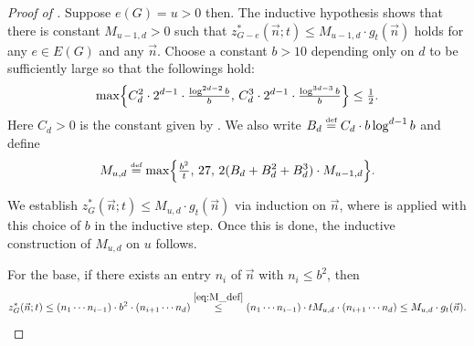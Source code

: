 \documentclass[11pt]{article}
\theoremstyle{definition}
\newcommand*{\eqdef}{\stackrel{\mbox{\normalfont\tiny def}}{=}} %
\newcommand*{\vn}{\vec{n}}
\begin{document}
\begin{proof}[Proof of ]
    Suppose $e(G) = u > 0$ then. The inductive hypothesis shows that there is constant $M_{u-1, d} > 0$ such that $z^*_{G-e}(\vn; t) \le M_{u-1, d} \cdot g_t(\vn)$ holds for any $e \in E(G)$ and any $\vn$. Choose a constant $b > 10$ depending only on $d$ to be sufficiently large so that the followings hold: 
    \begin{equation} \label{eq:b_def}
        \max \Bigl\{ C_d^2 \cdot 2^{d-1} \cdot \tfrac{\log^{2d-2}b}{b}, \, C_d^3 \cdot 2^{d-1} \cdot \tfrac{\log^{3d-3}b}{b} \Bigr\} \le \tfrac{1}{2}. 
    \end{equation}
    Here $C_d > 0$ is the constant given by . We also write $B_d \eqdef C_d \cdot b\log^{d-1} b$ and define
    \begin{equation} \label{eq:M_def}
        M_{u, d} \eqdef \max \Bigl\{ \tfrac{b^2}{t}, \, 27, \, 2(B_d+B_d^2+B_d^3) \cdot M_{u-1,d} \Bigr\}. 
    \end{equation}
    
    We establish $z^*_G(\vn; t) \le M_{u, d} \cdot g_t(\vn)$ via induction on $\vn$, where  is applied with this choice of $b$ in the inductive step. Once this is done, the inductive construction of $M_{u, d}$ on $u$ follows. 
    
    For the base, if there exists an entry $n_i$ of $\vn$ with $n_i \le b^2$, then
    \[
    z^*_G(\vn; t) \le (n_1 \cdots n_{i-1}) \cdot b^2 \cdot (n_{i+1} \cdots n_d) \overset{\eqref{eq:M_def}}{\le} (n_1 \cdots n_{i-1}) \cdot tM_{u, d} \cdot (n_{i+1} \cdots n_d) \le M_{u, d} \cdot g_t(\vn). 
    \]
    

\end{proof}
\end{document}
